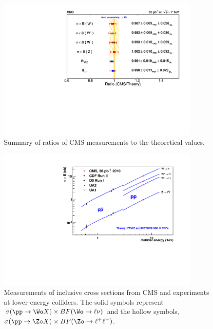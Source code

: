 \begin{figure}
\begin{center}
  \includegraphics[width=0.9\textwidth]{figs/Results_ratioTheory.pdf}
\caption[.]{\label{fig:RatioCMSTHY}
Summary of ratios of CMS measurements to the theoretical values. }
\end{center}
\end{figure}

\begin{figure}
\begin{center}
\includegraphics[width=0.9\textwidth]{figs/WZsigmas.pdf}
\caption[.]{\label{fig:WZsigmas}
Measurements of inclusive cross sections from CMS and experiments
at lower-energy colliders.  The solid symbols represent
$\sigma( \pp \to \Wo X)\times BF(\Wo\rightarrow\ell\nu)$ and the
hollow symbols, $\sigma(\pp\to\Zo X)\times BF(\Zo\rightarrow\ell^+\ell^-)$.}
\end{center}
\end{figure}


